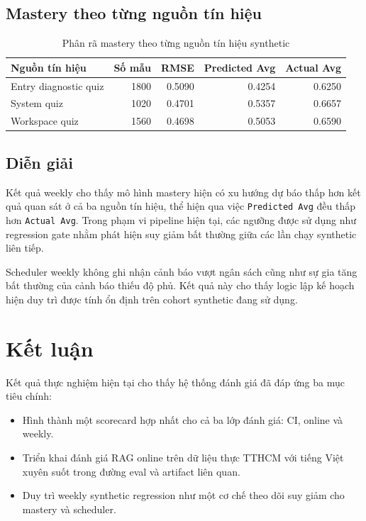 \documentclass[12pt,a4paper]{article}
\begin{document}
\subsection{Mastery theo từng nguồn tín hiệu}

\begin{table}[H]
\centering
\small
\begin{tabularx}{\textwidth}{L{4.0cm} r r r r}
\toprule
\textbf{Nguồn tín hiệu} & \textbf{Số mẫu} & \textbf{RMSE} & \textbf{Predicted Avg} & \textbf{Actual Avg} \\
\midrule
Entry diagnostic quiz & 1800 & 0.5090 & 0.4254 & 0.6250 \\
System quiz & 1020 & 0.4701 & 0.5357 & 0.6657 \\
Workspace quiz & 1560 & 0.4698 & 0.5053 & 0.6590 \\
\bottomrule
\end{tabularx}
\caption{Phân rã mastery theo từng nguồn tín hiệu synthetic}
\end{table}

\subsection{Diễn giải}

Kết quả weekly cho thấy mô hình mastery hiện có xu hướng dự báo thấp hơn kết quả quan sát ở cả ba nguồn tín hiệu, thể hiện qua việc \texttt{Predicted Avg} đều thấp hơn \texttt{Actual Avg}. Trong phạm vi pipeline hiện tại, các ngưỡng được sử dụng như regression gate nhằm phát hiện suy giảm bất thường giữa các lần chạy synthetic liên tiếp.

Scheduler weekly không ghi nhận cảnh báo vượt ngân sách cũng như sự gia tăng bất thường của cảnh báo thiếu độ phủ. Kết quả này cho thấy logic lập kế hoạch hiện duy trì được tính ổn định trên cohort synthetic đang sử dụng.

\section{Kết luận}

Kết quả thực nghiệm hiện tại cho thấy hệ thống đánh giá đã đáp ứng ba mục tiêu chính:
\begin{itemize}
    \item Hình thành một scorecard hợp nhất cho cả ba lớp đánh giá: CI, online và weekly.
    \item Triển khai đánh giá RAG online trên dữ liệu thực TTHCM với tiếng Việt xuyên suốt trong đường eval và artifact liên quan.
    \item Duy trì weekly synthetic regression như một cơ chế theo dõi suy giảm cho mastery và scheduler.
\end{itemize}
\end{document}
